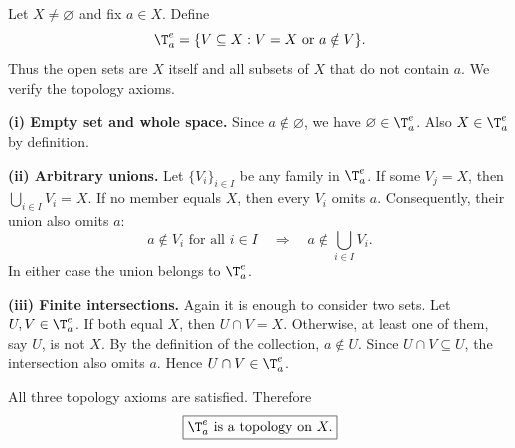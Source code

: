 
Let $X\neq\varnothing$ and fix $a\in X$. Define
\[ \T_a^e=\{V\subseteq X : V=X \text{ or } a\notin V\}. \]
Thus the open sets are $X$ itself and all subsets of $X$ that do not contain $a$. We verify the
topology axioms.

\textbf{(i) Empty set and whole space.} Since $a\notin\varnothing$, we have
$\varnothing\in\T_a^e$. Also $X\in\T_a^e$ by definition.

\textbf{(ii) Arbitrary unions.} Let $\{V_i\}_{i\in I}$ be any family in $\T_a^e$. If some
$V_j=X$, then $\bigcup_{i\in I}V_i=X$. If no member equals $X$, then every $V_i$ omits $a$.
Consequently, their union also omits $a$:
\[ a\notin V_i \text{ for all } i\in I\quad\Longrightarrow\quad a\notin\bigcup_{i\in I}V_i. \]
In either case the union belongs to $\T_a^e$.

\textbf{(iii) Finite intersections.} Again it is enough to consider two sets. Let
$U,V\in\T_a^e$. If both equal $X$, then $U\cap V=X$. Otherwise, at least one of them, say $U$,
is not $X$. By the definition of the collection, $a\notin U$. Since $U\cap V\subseteq U$, the
intersection also omits $a$. Hence $U\cap V\in\T_a^e$.

All three topology axioms are satisfied. Therefore
\[ \boxed{\T_a^e \text{ is a topology on } X.} \]
